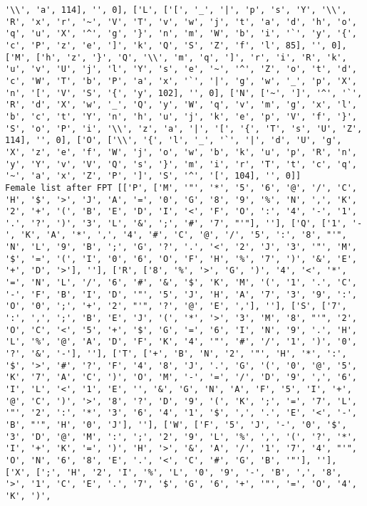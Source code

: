 \documentclass{article}
\begin{document}
\begin{verbatim}
'\\', 'a', 114], '', 0], ['L', ['[', '_', '|', 'p', 's', 'Y', '\\', 'R', 'x', 'r', '~', 'V', 'T', 'v', 'w', 'j', 't', 'a', 'd', 'h', 'o', 'q', 'u', 'X', '^', 'g', '}', 'n', 'm', 'W', 'b', 'i', '`', 'y', '{', 'c', 'P', 'z', 'e', ']', 'k', 'Q', 'S', 'Z', 'f', 'l', 85], '', 0], ['M', ['h', 'z', '}', 'Q', '\\', 'm', 'q', ']', 'r', 'i', 'R', 'k', 'u', 'v', 'U', 'j', 'l', 'Y', 's', 'e', '~', '^', 'Z', 'o', 't', 'd', 'c', 'W', 'T', 'b', 'P', 'a', 'x', '`', '|', 'g', 'w', '_', 'p', 'X', 'n', '[', 'V', 'S', '{', 'y', 102], '', 0], ['N', ['~', ']', '^', '`', 'R', 'd', 'X', 'w', '_', 'Q', 'y', 'W', 'q', 'v', 'm', 'g', 'x', 'l', 'b', 'c', 't', 'Y', 'n', 'h', 'u', 'j', 'k', 'e', 'p', 'V', 'f', '}', 'S', 'o', 'P', 'i', '\\', 'z', 'a', '|', '[', '{', 'T', 's', 'U', 'Z', 114], '', 0], ['O', ['\\', '{', 'l', '_', '`', '|', 'd', 'U', 'g', 'X', 'z', 'e', 'f', 'W', 'j', 'o', 'w', 'b', 'k', 'u', 'p', 'R', 'n', 'y', 'Y', 'v', 'V', 'Q', 's', '}', 'm', 'i', 'r', 'T', 't', 'c', 'q', '~', 'a', 'x', 'Z', 'P', ']', 'S', '^', '[', 104], '', 0]]
Female list after FPT [['P', ['M', '"', '*', '5', '6', '@', '/', 'C', 'H', '$', '>', 'J', 'A', '=', '0', 'G', '8', '9', '%', 'N', ',', 'K', '2', '+', '(', 'B', 'E', 'D', 'I', '<', 'F', 'O', ':', '4', '-', '1', '.', '?', ')', '3', 'L', '&', ';', '#', '7', "'"], ''], ['Q', ['1', '-', 'K', 'A', '*', ',', '4', '#', 'C', '@', '/', '5', ':', '8', "'", 'N', 'L', '9', 'B', ';', 'G', '?', '.', '<', '2', 'J', '3', '"', 'M', '$', '=', '(', 'I', '0', '6', 'O', 'F', 'H', '%', '7', ')', '&', 'E', '+', 'D', '>'], ''], ['R', ['8', '%', '>', 'G', ')', '4', '<', '*', '=', 'N', 'L', '/', '6', '#', '&', '$', 'K', 'M', '(', '1', '.', 'C', '-', 'F', 'B', 'I', 'D', '"', '5', 'J', 'H', 'A', '7', '3', '9', ':', 'O', '0', ';', '+', '2', "'", '?', '@', 'E', ','], ''], ['S', ['7', ':', ',', ';', 'B', 'E', 'J', '(', '*', '>', '3', 'M', '8', "'", '2', 'O', 'C', '<', '5', '+', '$', 'G', '=', '6', 'I', 'N', '9', '.', 'H', 'L', '%', '@', 'A', 'D', 'F', 'K', '4', '"', '#', '/', '1', ')', '0', '?', '&', '-'], ''], ['T', ['+', 'B', 'N', '2', '"', 'H', '*', ':', '$', '>', '#', '?', 'F', '4', '8', 'J', '.', 'G', '(', '0', '@', '5', 'K', '7', 'A', 'C', ')', 'O', 'M', '-', '=', '/', 'D', '9', ',', '6', 'I', 'L', '<', '1', 'E', '', '&', 'G', 'N', 'A', 'F', '5', 'I', '+', '@', 'C', ')', '>', '8', '?', 'D', '9', '(', 'K', ';', '=', '7', 'L', '"', '2', ':', '*', '3', '6', '4', '1', '$', ',', '.', 'E', '<', '-', 'B', "'", 'H', '0', 'J'], ''], ['W', ['F', '5', 'J', '-', '0', '$', '3', 'D', '@', 'M', ':', ';', '2', '9', 'L', '%', ',', '(', '?', '*', 'I', '+', 'K', '=', ')', 'H', '>', '&', 'A', '/', '1', '7', '4', "'", 'O', 'N', '6', '8', 'E', '.', '<', 'C', '#', 'G', 'B', '"'], ''], ['X', [';', 'H', '2', 'I', '%', 'L', '0', '9', '-', 'B', ',', '8', '>', '1', 'C', 'E', '.', '7', '$', 'G', '6', '+', '"', '=', 'O', '4', 'K', ')', 

\end{verbatim}
\end{document}
